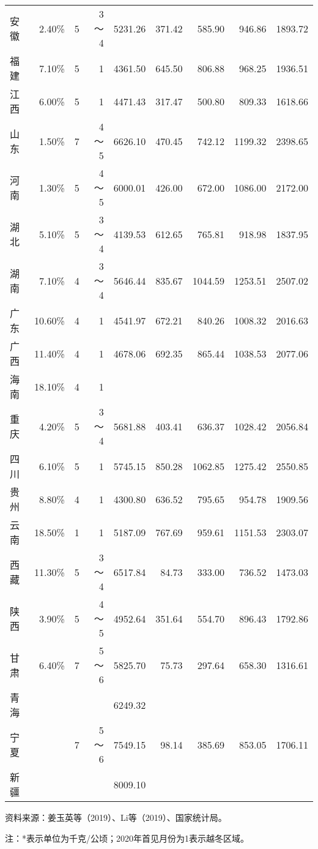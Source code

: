 \documentclass{progbookcn}
\begin{document}
\begin{table}[]
\begin{threeparttable}
\begin{tabular}{lrrrrrrrr}
安徽  & 2.40\%  & 5 & 3～4 & 5231.26 & 371.42 & 585.90  & 946.86  & 1893.72 \\
福建  & 7.10\%  & 5 & 1   & 4361.50 & 645.50 & 806.88  & 968.25  & 1936.51 \\
江西  & 6.00\%  & 5 & 1   & 4471.43 & 317.47 & 500.80  & 809.33  & 1618.66 \\
山东  & 1.50\%  & 7 & 4～5 & 6626.10 & 470.45 & 742.12  & 1199.32 & 2398.65 \\
河南  & 1.30\%  & 5 & 4～5 & 6000.01 & 426.00 & 672.00  & 1086.00 & 2172.00 \\
湖北  & 5.10\%  & 5 & 3～4 & 4139.53 & 612.65 & 765.81  & 918.98  & 1837.95 \\
湖南  & 7.10\%  & 4 & 3～4 & 5646.44 & 835.67 & 1044.59 & 1253.51 & 2507.02 \\
广东  & 10.60\% & 4 & 1   & 4541.97 & 672.21 & 840.26  & 1008.32 & 2016.63 \\
广西  & 11.40\% & 4 & 1   & 4678.06 & 692.35 & 865.44  & 1038.53 & 2077.06 \\
海南  & 18.10\% & 4 & 1   &         &        &         &         &         \\
重庆  & 4.20\%  & 5 & 3～4 & 5681.88 & 403.41 & 636.37  & 1028.42 & 2056.84 \\
四川  & 6.10\%  & 5 & 1   & 5745.15 & 850.28 & 1062.85 & 1275.42 & 2550.85 \\
贵州  & 8.80\%  & 4 & 1   & 4300.80 & 636.52 & 795.65  & 954.78  & 1909.56 \\
云南  & 18.50\% & 1 & 1   & 5187.09 & 767.69 & 959.61  & 1151.53 & 2303.07 \\
西藏  & 11.30\% & 5 & 3～4 & 6517.84 & 84.73  & 333.00  & 736.52  & 1473.03 \\
陕西  & 3.90\%  & 5 & 4～5 & 4952.64 & 351.64 & 554.70  & 896.43  & 1792.86 \\
甘肃  & 6.40\%  & 7 & 5～6 & 5825.70 & 75.73  & 297.64  & 658.30  & 1316.61 \\
青海  &         &   &     & 6249.32 &        &         &         &         \\
宁夏  &         & 7 & 5～6 & 7549.15 & 98.14  & 385.69  & 853.05  & 1706.11 \\
新疆  &         &   &     & 8009.10 &        &         &         &    \\
\hline
\end{tabular}
\begin{tablenotes}
\item \tiny{资料来源：姜玉英等（2019）、Li等（2019）、国家统计局。}
\item \tiny{注：*表示单位为千克/公顷；2020年首见月份为1表示越冬区域。}
\end{tablenotes}
\end{threeparttable}
\end{table}
\end{document}
